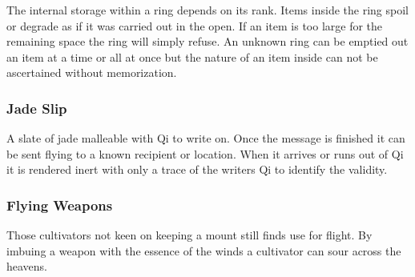 The internal storage within a ring depends on its rank. Items inside the ring spoil or degrade as if it was carried out in the open. 
If an item is too large for the remaining space the ring will simply refuse. 
An unknown ring can be emptied out an item at a time or all at once but the nature of an item inside can not be ascertained without memorization.

\subsubsection{Jade Slip}

A slate of jade malleable with Qi to write on. Once the message is finished it can be sent flying to a known recipient or location. 
When it arrives or runs out of Qi it is rendered inert with only a trace of the writers Qi to identify the validity.

\subsubsection{Flying Weapons}

Those cultivators not keen on keeping a mount still finds use for flight.
By imbuing a weapon with the essence of the winds a cultivator can sour across the heavens.